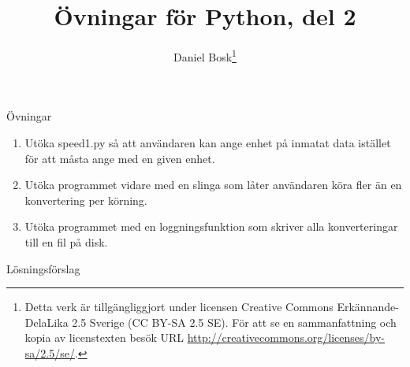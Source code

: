 \documentclass[handout]{beamer}
\title{%
  Övningar för Python, del 2
}
\author{Daniel Bosk\footnote{%
  Detta verk är tillgängliggjort under licensen Creative Commons 
  Erkännande-DelaLika 2.5 Sverige (CC BY-SA 2.5 SE).
	För att se en sammanfattning och kopia av licenstexten besök URL 
	\url{http://creativecommons.org/licenses/by-sa/2.5/se/}.
}}
\institute{%
  Avdelningen för informations- och kommunikationssytem (IKS),\\
  Mittuniversitetet, Sundsvall.
}
\date{\svnId}
\begin{document}
\begin{frame}
  \titlepage
\end{frame}

%  

\begin{frame}{Övningar}
  \begin{enumerate}
    \item Utöka speed1.py så att användaren kan ange enhet på inmatat data 
      istället för att måsta ange med en given enhet.

    \item Utöka programmet vidare med en slinga som låter användaren köra fler 
      än en konvertering per körning.

    \item Utöka programmet med en loggningsfunktion som skriver alla 
      konverteringar till en fil på disk.

  \end{enumerate}
\end{frame}

\begin{frame}{Lösningsförslag}
  
\end{frame}



%  
\end{document}

